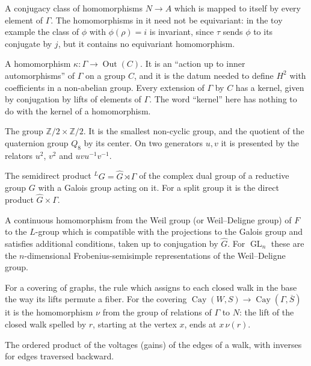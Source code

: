 \documentclass[12pt,letterpaper]{article}
\numberwithin{equation}{section}
\theoremstyle{plain}
\theoremstyle{definition}
\newcommand{\Z}{\mathbb{Z}}
\newcommand{\Gh}{\widehat{G}}
\newcommand{\LG}{{}^{L}G}
\DeclareMathOperator{\Out}{Out}
\DeclareMathOperator{\Cay}{Cay}
\DeclareMathOperator{\GL}{GL}
\begin{document}
\begin{description}[itemsep=3pt,leftmargin=1.5em,style=unboxed]
\item[Invariant class.] A conjugacy class of homomorphisms $N\to A$ which
is mapped to itself by every element of $\Gamma$. The homomorphisms in it
need not be equivariant: in the toy example the class of $\phi$ with
$\phi(\rho)=i$ is invariant, since $\tau$ sends $\phi$ to its conjugate by
$j$, but it contains no equivariant homomorphism.

\item[Kernel (band).] A homomorphism $\kappa:\Gamma\to\Out(C)$. It is an
``action up to inner automorphisms'' of $\Gamma$ on a group $C$, and it is
the datum needed to define $H^2$ with coefficients in a non-abelian
group. Every extension of $\Gamma$ by $C$ has a kernel, given by
conjugation by lifts of elements of $\Gamma$. The word ``kernel'' here has
nothing to do with the kernel of a homomorphism.

\item[Klein four-group.] The group $\Z/2\times\Z/2$. It is the smallest
non-cyclic group, and the quotient of the quaternion group $Q_8$ by its
center. On two generators $u,v$ it is presented by the relators $u^2$,
$v^2$ and $uvu^{-1}v^{-1}$.

\item[$L$-group.] The semidirect product $\LG=\Gh\rtimes\Gamma$ of the
complex dual group of a reductive group $G$ with a Galois group acting on
it. For a split group it is the direct product $\Gh\times\Gamma$.

\item[Langlands parameter.] A continuous homomorphism from the Weil group
(or Weil--Deligne group) of $F$ to the $L$-group which is compatible with
the projections to the Galois group and satisfies additional conditions,
taken up to conjugation by $\Gh$. For $\GL_n$ these are the
$n$-dimensional Frobenius-semisimple representations of the Weil--Deligne
group.

\item[Monodromy.] For a covering of graphs, the rule which assigns to
each closed walk in the base the way its lifts permute a fiber. For the
covering $\Cay(W,S)\to\Cay(\Gamma,\overline{S})$ it is the homomorphism
$\nu$ from the group of relations of $\Gamma$ to $N$: the lift of the
closed walk spelled by $r$, starting at the vertex $x$, ends at
$x\,\nu(r)$.

\item[Net voltage, net gain.] The ordered product of the voltages (gains)
of the edges of a walk, with inverses for edges traversed backward.


\end{description}
\end{document}
